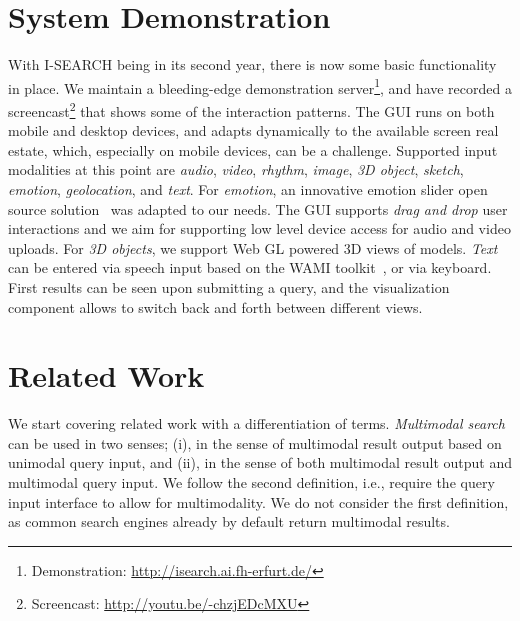 \documentclass{acm_proc_article-sp}
\let\oldemph\emph
\renewcommand{\emph}[1]{\oldemph{\fontsize{9}{9}\selectfont #1}}
\newcommand{\inlinelistingsize}{\fontsize{8pt}{11pt}}
\let\oldurl\url
\renewcommand{\url}[1]{\inlinelistingsize\oldurl{#1}}
\begin{document}
\section{System Demonstration} \label{sec:systemdemonstration}
With \mbox{I-SEARCH} being in its second year, there is now some basic functionality in place.
We maintain a bleeding-edge demonstration server\footnote{Demonstration: \url{http://isearch.ai.fh-erfurt.de/}}, and have recorded a screencast\footnote{Screencast: \url{http://youtu.be/-chzjEDcMXU}} that shows some of the interaction patterns.
The GUI runs on both mobile and desktop devices, and adapts dynamically to the available screen real estate, which, especially on mobile devices, can be a challenge.
Supported input modalities at this point are \emph{audio}, \emph{video}, \emph{rhythm}, \emph{image}, \emph{3D object}, \emph{sketch}, \emph{emotion}, \emph{geolocation}, and \emph{text}.
For \emph{emotion}, an innovative emotion slider open source solution~\cite{emotionslider} was adapted to our needs.
The GUI supports \textit{drag and drop} user interactions and we aim for supporting low level device access for audio and video uploads.
For \emph{3D objects}, we support Web GL powered 3D views of models.
\emph{Text} can be entered via speech input based on the WAMI toolkit~\cite{wami}, or via keyboard.
First results can be seen upon submitting a query, and the visualization component allows to switch back and forth between different views.

\section{Related Work} \label{sec:relatedwork}
We start covering related work with a differentiation of terms.
\emph{Multimodal search} can be used in two senses; (i), in the sense of multimodal result output based on unimodal query input, and (ii), in the sense of both multimodal result output and multimodal query input.
We follow the second definition, i.e., require the query input interface to allow for multimodality.
We do not consider the first definition, as common search engines already by default return multimodal results.
\end{document}
